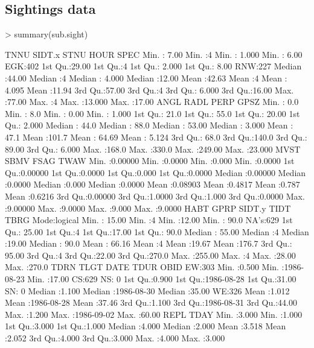 \documentclass{article}
\begin{document}
\subsection{Sightings data}
  
\begin{Schunk}
\begin{Sinput}
> summary(sub.sight)
\end{Sinput}
\begin{Soutput}
      TNNU           SIDT.x       STNU             HOUR        SPEC    
 Min.   : 7.00   Min.   :4   Min.   : 1.000   Min.   : 6.00   EGK:402  
 1st Qu.:29.00   1st Qu.:4   1st Qu.: 2.000   1st Qu.: 8.00   RNW:227  
 Median :44.00   Median :4   Median : 4.000   Median :12.00            
 Mean   :42.63   Mean   :4   Mean   : 4.095   Mean   :11.94            
 3rd Qu.:57.00   3rd Qu.:4   3rd Qu.: 6.000   3rd Qu.:16.00            
 Max.   :77.00   Max.   :4   Max.   :13.000   Max.   :17.00            
      ANGL            RADL            PERP             GPSZ       
 Min.   :  0.0   Min.   :  8.0   Min.   :  0.00   Min.   : 1.000  
 1st Qu.: 21.0   1st Qu.: 55.0   1st Qu.: 20.00   1st Qu.: 2.000  
 Median : 44.0   Median : 88.0   Median : 53.00   Median : 3.000  
 Mean   : 47.1   Mean   :101.7   Mean   : 64.69   Mean   : 5.124  
 3rd Qu.: 68.0   3rd Qu.:140.0   3rd Qu.: 89.00   3rd Qu.: 6.000  
 Max.   :168.0   Max.   :330.0   Max.   :249.00   Max.   :23.000  
      MVST              SBMV             FSAG            TWAW       
 Min.   :0.00000   Min.   :0.0000   Min.   :0.000   Min.   :0.0000  
 1st Qu.:0.00000   1st Qu.:0.0000   1st Qu.:0.000   1st Qu.:0.0000  
 Median :0.00000   Median :0.0000   Median :0.000   Median :0.0000  
 Mean   :0.08903   Mean   :0.4817   Mean   :0.787   Mean   :0.6216  
 3rd Qu.:0.00000   3rd Qu.:1.0000   3rd Qu.:1.000   3rd Qu.:0.0000  
 Max.   :9.00000   Max.   :9.0000   Max.   :9.000   Max.   :9.0000  
   HABT              GPRP            SIDT.y       TIDT            TBRG      
 Mode:logical   Min.   : 15.00   Min.   :4   Min.   :12.00   Min.   : 90.0  
 NA's:629       1st Qu.: 25.00   1st Qu.:4   1st Qu.:17.00   1st Qu.: 90.0  
                Median : 55.00   Median :4   Median :19.00   Median : 90.0  
                Mean   : 66.16   Mean   :4   Mean   :19.67   Mean   :176.7  
                3rd Qu.: 95.00   3rd Qu.:4   3rd Qu.:22.00   3rd Qu.:270.0  
                Max.   :255.00   Max.   :4   Max.   :28.00   Max.   :270.0  
 TDRN          TLGT            DATE                 TDUR       OBID    
 EW:303   Min.   :0.500   Min.   :1986-08-23   Min.   :17.00   CS:629  
 NS:  0   1st Qu.:0.900   1st Qu.:1986-08-28   1st Qu.:31.00           
 SN:  0   Median :1.100   Median :1986-08-30   Median :35.00           
 WE:326   Mean   :1.012   Mean   :1986-08-28   Mean   :37.46           
          3rd Qu.:1.100   3rd Qu.:1986-08-31   3rd Qu.:44.00           
          Max.   :1.200   Max.   :1986-09-02   Max.   :60.00           
      REPL            TDAY      
 Min.   :3.000   Min.   :1.000  
 1st Qu.:3.000   1st Qu.:1.000  
 Median :4.000   Median :2.000  
 Mean   :3.518   Mean   :2.052  
 3rd Qu.:4.000   3rd Qu.:3.000  
 Max.   :4.000   Max.   :3.000  
\end{Soutput}
\end{Schunk}
\end{document}
